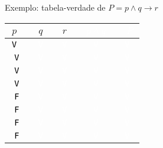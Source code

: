 \begin{frame}[fragile]{Exemplo: tabela-verdade de $P = p \land q \to r$}

    \begin{table}
        \centering
        \begin{tabular}{>{\tt}c>{\tt}c>{\tt}c>{\tt}c>{\tt}c}
            \hline
            $p$ & $q$ & $r$ & \textcolor{white}{$p\land q$} & \textcolor{white}{$P$}\\
            \hline
            \textcolor{black}{V} & \textcolor{white}{V} & \textcolor{white}{V} & \textcolor{white}{V} & \textcolor{white}{V} \\
            \hline
            \textcolor{black}{V} & \textcolor{white}{V} & \textcolor{white}{V} & \textcolor{white}{V} & \textcolor{white}{V} \\
            \hline
            \textcolor{black}{V} & \textcolor{white}{V} & \textcolor{white}{V} & \textcolor{white}{V} & \textcolor{white}{V} \\
            \hline
            \textcolor{black}{V} & \textcolor{white}{V} & \textcolor{white}{V} & \textcolor{white}{V} & \textcolor{white}{V} \\
            \hline
            \textcolor{black}{F} & \textcolor{white}{V} & \textcolor{white}{V} & \textcolor{white}{V} & \textcolor{white}{V} \\
            \hline
            \textcolor{black}{F} & \textcolor{white}{V} & \textcolor{white}{V} & \textcolor{white}{V} & \textcolor{white}{V} \\
            \hline
            \textcolor{black}{F} & \textcolor{white}{V} & \textcolor{white}{V} & \textcolor{white}{V} & \textcolor{white}{V} \\
            \hline
            \textcolor{black}{F} & \textcolor{white}{V} & \textcolor{white}{V} & \textcolor{white}{V} & \textcolor{white}{V} \\
            \hline
        \end{tabular}
    \end{table}
\end{frame}

